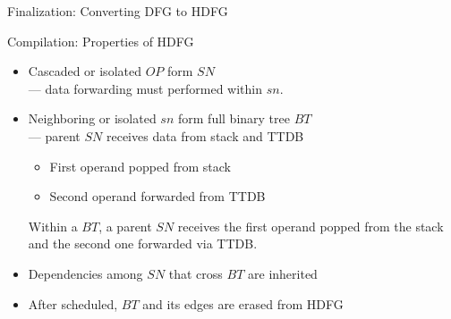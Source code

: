 \documentclass{beamer}
\begin{document}
\begin{CJK}{UTF8}{bkai}
\begin{frame}{Finalization: Converting DFG to HDFG}
\begin{figure}[!ht]
\begin{center}
{                }
            \end{center}
        \end{figure}
    \end{frame}
    \begin{frame}{Compilation: Properties of HDFG}
        \begin{itemize}
            \item Cascaded or isolated $OP$ form $SN$ \\ --- data forwarding must performed within $sn$.
            \item Neighboring or isolated $sn$ form full binary tree $BT$ \\
                --- parent $SN$ receives data from stack and TTDB
                \begin{itemize}
                    \item First operand popped from stack
                    \item Second operand forwarded from TTDB
                \end{itemize}
                Within a $BT$, a parent $SN$ receives the first operand popped from the stack and the second one forwarded via TTDB.
            \item Dependencies among $SN$ that cross $BT$ are inherited
            \item After scheduled, $BT$ and its edges are erased from HDFG
        \end{itemize}
    \end{frame}




\end{CJK}
\end{document}
